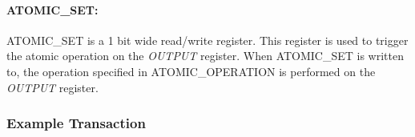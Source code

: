 \paragraph{ATOMIC\_SET:}
ATOMIC\_SET is a 1 bit wide read/write register. This register is used to trigger the atomic operation on the \textit{OUTPUT} register. 
When ATOMIC\_SET is written to, the operation specified in ATOMIC\_OPERATION is performed on the \textit{OUTPUT} register.

\subsubsection{Example Transaction}






